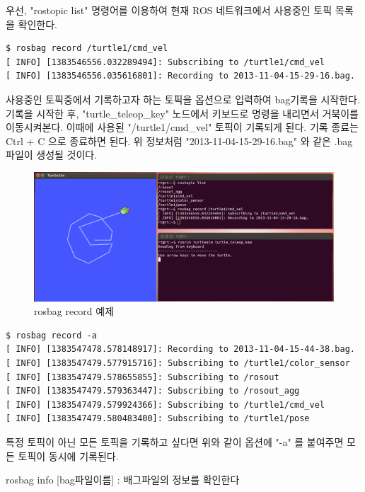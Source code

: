\noindent
우선, "rostopic list" 명령어를 이용하여 현재 ROS 네트워크에서 사용중인 토픽 목록을 확인한다.

\begin{lstlisting}[language=ROS]
$ rosbag record /turtle1/cmd_vel
[ INFO] [1383546556.032289494]: Subscribing to /turtle1/cmd_vel
[ INFO] [1383546556.035616801]: Recording to 2013-11-04-15-29-16.bag.
\end{lstlisting}

\noindent
사용중인 토픽중에서 기록하고자 하는 토픽을 옵션으로 입력하여 bag기록을 시작한다. 기록을 시작한 후, "turtle\_teleop\_key" 노드에서 키보드로 명령을 내리면서 거북이를 이동시켜본다. 이때에 사용된 "/turtle1/cmd\_vel" 토픽이 기록되게 된다. 기록 종료는 Ctrl + C 으로 종료하면 된다. 위 정보처럼 "2013-11-04-15-29-16.bag" 와 같은 .bag 파일이 생성될 것이다.

\newpage

\begin{figure}[h]
\centering\includegraphics[width=0.8\columnwidth]{pictures/chapter5/rosbag_record.png}
\caption{rosbag record 예제}
\end{figure}

\begin{lstlisting}[language=ROS]
$ rosbag record -a
[ INFO] [1383547478.578148917]: Recording to 2013-11-04-15-44-38.bag.
[ INFO] [1383547479.577915716]: Subscribing to /turtle1/color_sensor
[ INFO] [1383547479.578655855]: Subscribing to /rosout
[ INFO] [1383547479.579363447]: Subscribing to /rosout_agg
[ INFO] [1383547479.579924366]: Subscribing to /turtle1/cmd_vel
[ INFO] [1383547479.580483400]: Subscribing to /turtle1/pose
\end{lstlisting}

\noindent
특정 토픽이 아닌 모든 토픽을 기록하고 싶다면 위와 같이 옵션에 "-a" 를 붙여주면 모든 토픽이 동시에 기록된다.

\vspace{\baselineskip}
\noindent
{}\circled{\thenum} rosbag info [bag파일이름] : 배그파일의 정보를 확인한다

